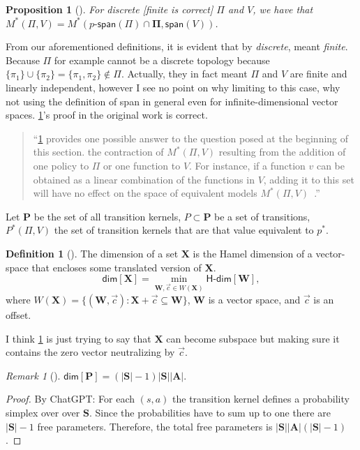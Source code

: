 \documentclass[a4paper]{article}
\theoremstyle{definition}
\newtheorem{definition}{Definition}
\theoremstyle{remark}
\newtheorem{remark}{Remark}
\theoremstyle{plain}
\newtheorem{proposition}{Proposition}
\newcommand{\bA}{\mathbf{A}}
\newcommand{\bS}{\mathbf{S}}
\newcommand{\bP}{\mathbf{P}}
\newcommand{\bW}{\mathbf{W}}
\newcommand{\bX}{\mathbf{X}}
\newcommand{\bPi}{\mathbf{\Pi}}
\begin{document}
\begin{proposition}[{\normalfont\citet[Proposition 1]{grimm2020value}}]
    \label{prpstn:dscrt-pi-vl}
    For discrete [finite is correct] $\Pi$ and $V$, we have that $M^*(\Pi, V) = M^*(p\textsf{-span}(\Pi) \cap \bPi, \textsf{span}(V))$.
\end{proposition}
%
From our aforementioned definitions, it is evident that by \emph{discrete}, \citet{grimm2020value} meant \emph{finite}. Because $\Pi$ for example cannot be a discrete topology because $\{\pi_1\} \cup \{\pi_2\} = \{\pi_1, \pi_2\} \notin \Pi$. Actually, they in fact meant $\Pi$ and $V$ are finite and linearly independent, however I see no point on why limiting to this case, why not using the definition of \textsf{span} in general even for infinite-dimensional vector spaces. \cref{prpstn:dscrt-pi-vl}'s proof in the original work is correct.
%
\begin{quote}
    ``\cref{prpstn:dscrt-pi-vl} provides one possible answer to the question posed at the beginning of this section. the contraction of $M^*(\Pi, V)$ resulting from the addition of one policy to $\Pi$ or one function to $V$. For instance, if a function $v$ can be obtained as a linear combination of the functions in $V$, adding it to this set will have no effect on the space of equivalent models $M^*(\Pi, V)$~\citep{grimm2020value}.''
\end{quote}
%
Let $\bP$ be the set of all transition kernels, $P \subset \bP$ be a set of transitions, $P^*(\Pi, V)$ the set of transition kernels that are that value equivalent to $p^*$.
%
\begin{definition}[{\normalfont \citet{grimm2020value}}]
\label{def:dim}
    The dimension of a set $\bX$ is the Hamel dimension of a vector-space that encloses some translated version of $\bX$.
    \begin{equation*}
        \textsf{dim}[\bX] = \min_{\bW, \vec{c} \in W(\bX)} \textsf{H-dim}[\bW],
    \end{equation*}
    where $W(\bX) = \{(\bW, \vec{c}): \bX + \vec{c} \subseteq \bW \}$, $\bW$ is a vector space, and $\vec{c}$ is an offset.
\end{definition}
I think \cref{def:dim} is just trying to say that $\bX$ can become subspace but making sure it contains the zero vector neutralizing by $\vec{c}$.
%
\begin{remark}[{\normalfont \citet{grimm2020value}}]
    $\textsf{dim}[\bP] = (|\bS| - 1)|\bS||\bA|$.
\end{remark}
%
\begin{proof}
    By ChatGPT:
    For each $(s, a)$ the transition kernel defines a probability simplex over over $\bS$. Since the probabilities have to sum up to one there are $|\bS| - 1$ free parameters. Therefore, the total free parameters is $|\bS||\bA|(|\bS| - 1)$. \qedhere 
\end{proof}
\end{document}
